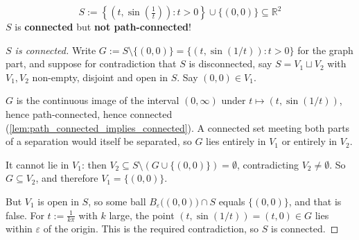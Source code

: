 \begin{example}
\label{ex:topologists_sine_curve}
\[S := \left\{\left(t, \sin\left(\tfrac{1}{t}\right)\right) : t > 0\right\} \cup \{(0,0)\} \subseteq \mathbb{R}^2\]
$S$ is \textbf{connected} but \textbf{not path-connected}!
\end{example}


\begin{center}
\end{center}

\begin{proof}[$S$ is connected]
Write $G := S \setminus \{(0,0)\} = \{(t,\sin(1/t)) : t>0\}$ for the graph part, and suppose for
contradiction that $S$ is disconnected, say $S = V_1 \sqcup V_2$ with $V_1,V_2$ non-empty,
disjoint and open in $S$. Say $(0,0) \in V_1$.

$G$ is the continuous image of the interval $(0,\infty)$ under
$t \mapsto (t,\sin(1/t))$, hence path-connected, hence connected
(\cref{lem:path_connected_implies_connected}). A connected set meeting both parts of a
separation would itself be separated, so $G$ lies entirely in $V_1$ or entirely in $V_2$.

It cannot lie in $V_1$: then $V_2 \subseteq S \setminus (G \cup \{(0,0)\}) = \emptyset$,
contradicting $V_2 \neq \emptyset$. So $G \subseteq V_2$, and therefore
$V_1 = \{(0,0)\}$.

But $V_1$ is open in $S$, so some ball $B_\varepsilon\big((0,0)\big) \cap S$ equals
$\{(0,0)\}$, and that is false. For $t := \tfrac{1}{k\pi}$ with $k$ large, the point
$(t,\sin(1/t)) = (t,0) \in G$ lies within $\varepsilon$ of the origin. This is the required
contradiction, so $S$ is connected.
\end{proof}


